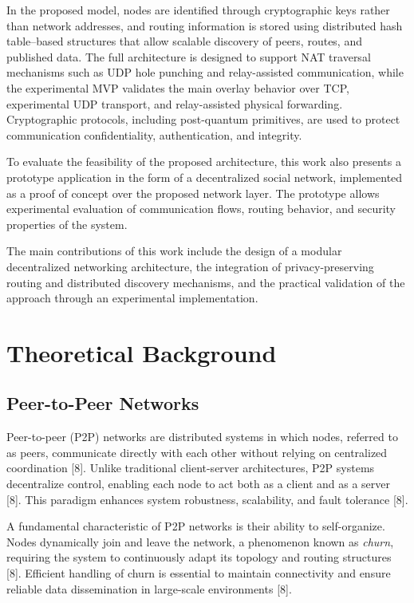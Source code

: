 \documentclass[12pt,a4paper]{article}
\begin{document}
In the proposed model, nodes are identified through cryptographic keys rather than network addresses, and routing information is stored using distributed hash table--based structures that allow scalable discovery of peers, routes, and published data. The full architecture is designed to support NAT traversal mechanisms such as UDP hole punching and relay-assisted communication, while the experimental MVP validates the main overlay behavior over TCP, experimental UDP transport, and relay-assisted physical forwarding. Cryptographic protocols, including post-quantum primitives, are used to protect communication confidentiality, authentication, and integrity.

To evaluate the feasibility of the proposed architecture, this work also presents a prototype application in the form of a decentralized social network, implemented as a proof of concept over the proposed network layer. The prototype allows experimental evaluation of communication flows, routing behavior, and security properties of the system.

The main contributions of this work include the design of a modular decentralized networking architecture, the integration of privacy-preserving routing and distributed discovery mechanisms, and the practical validation of the approach through an experimental implementation.







\clearpage
\section{Theoretical Background}

\subsection{Peer-to-Peer Networks}

Peer-to-peer (P2P) networks are distributed systems in which nodes, referred to as peers, communicate directly with each other without relying on centralized coordination [8]. Unlike traditional client-server architectures, P2P systems decentralize control, enabling each node to act both as a client and as a server [8]. This paradigm enhances system robustness, scalability, and fault tolerance [8].

A fundamental characteristic of P2P networks is their ability to self-organize. Nodes dynamically join and leave the network, a phenomenon known as \textit{churn}, requiring the system to continuously adapt its topology and routing structures [8]. Efficient handling of churn is essential to maintain connectivity and ensure reliable data dissemination in large-scale environments [8].
\end{document}
